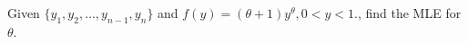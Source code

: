 Given $\{y_1,y_2,\dotso,y_{n-1}, y_n\}$ and $f(y)=(\theta+1)y^{\theta}, 0 < y < 1.$, find the MLE for $\theta$.

\smallspace


